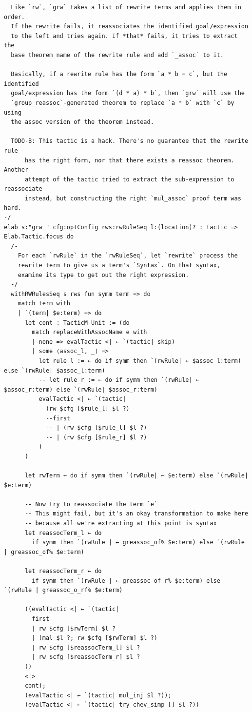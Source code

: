 \begin{Verbatim}
  Like `rw`, `grw` takes a list of rewrite terms and applies them in order.
  If the rewrite fails, it reassociates the identified goal/expression
  to the left and tries again. If *that* fails, it tries to extract the
  base theorem name of the rewrite rule and add `_assoc` to it.

  Basically, if a rewrite rule has the form `a * b = c`, but the identified
  goal/expression has the form `(d * a) * b`, then `grw` will use the
  `group_reassoc`-generated theorem to replace `a * b` with `c` by using
  the assoc version of the theorem instead.

  TODO-B: This tactic is a hack. There's no guarantee that the rewrite rule
      has the right form, nor that there exists a reassoc theorem. Another
      attempt of the tactic tried to extract the sub-expression to reassociate
      instead, but constructing the right `mul_assoc` proof term was hard.
-/
elab s:"grw " cfg:optConfig rws:rwRuleSeq l:(location)? : tactic => Elab.Tactic.focus do
  /-
    For each `rwRule` in the `rwRuleSeq`, let `rewrite` process the
    rewrite term to give us a term's `Syntax`. On that syntax,
    examine its type to get out the right expression.
  -/
  withRWRulesSeq s rws fun symm term => do
    match term with
    | `(term| $e:term) => do
      let cont : TacticM Unit := (do
        match replaceWithAssocName e with
        | none => evalTactic <| ← `(tactic| skip)
        | some ⟨assoc_l, _⟩ =>
          let rule_l := ← do if symm then `(rwRule| ← $assoc_l:term) else `(rwRule| $assoc_l:term)
          -- let rule_r := ← do if symm then `(rwRule| ← $assoc_r:term) else `(rwRule| $assoc_r:term)
          evalTactic <| ← `(tactic|
            (rw $cfg [$rule_l] $l ?)
            --first
            -- | (rw $cfg [$rule_l] $l ?)
            -- | (rw $cfg [$rule_r] $l ?)
          )
      )

      let rwTerm ← do if symm then `(rwRule| ← $e:term) else `(rwRule| $e:term)

      -- Now try to reassociate the term `e`
      -- This might fail, but it's an okay transformation to make here
      -- because all we're extracting at this point is syntax
      let reassocTerm_l ← do
        if symm then `(rwRule | ← greassoc_of% $e:term) else `(rwRule | greassoc_of% $e:term)

      let reassocTerm_r ← do
        if symm then `(rwRule | ← greassoc_of_r% $e:term) else `(rwRule | greassoc_o_rf% $e:term)

      ((evalTactic <| ← `(tactic|
        first
        | rw $cfg [$rwTerm] $l ?
        | (mal $l ?; rw $cfg [$rwTerm] $l ?)
        | rw $cfg [$reassocTerm_l] $l ?
        | rw $cfg [$reassocTerm_r] $l ?
      ))
      <|>
      cont);
      (evalTactic <| ← `(tactic| mul_inj $l ?));
      (evalTactic <| ← `(tactic| try chev_simp [] $l ?))


\end{Verbatim}

